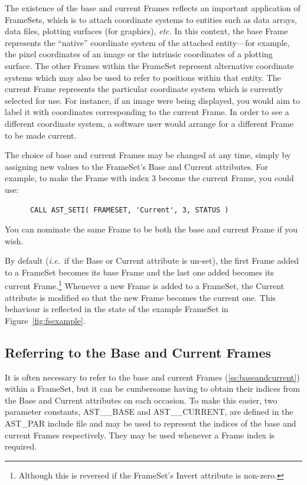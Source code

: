 \documentclass[twoside,11pt]{article}
\newcommand{\htmlref}[2]{#1}
\newcommand{\secref}[1]{\S\ref{#1}}
\renewcommand{\secref}[1]{\ref{#1}}
\begin{document}
The existence of the base and current Frames reflects an important
application of FrameSets, which is to attach coordinate systems to
entities such as data arrays, data files, plotting surfaces (for
graphics), {\em{etc.}}  In this context, the base Frame represents the
``native'' coordinate system of the attached entity---for example, the
pixel coordinates of an image or the intrinsic coordinates of a
plotting surface. The other Frames within the FrameSet represent
alternative coordinate systems which may also be used to refer to
positions within that entity.  The current Frame represents the
particular coordinate system which is currently selected for use. For
instance, if an image were being displayed, you would aim to label it
with coordinates corresponding to the current Frame. In order to see a
different coordinate system, a software user would arrange for a
different Frame to be made current.

The choice of base and current Frames may be changed at any time,
simply by assigning new values to the FrameSet's Base and Current
attributes. For example, to make the Frame with index 3 become the
current Frame, you could use:

\small
\begin{verbatim}
      CALL AST_SETI( FRAMESET, 'Current', 3, STATUS )
\end{verbatim}
\normalsize

You can nominate the same Frame to be both the base and current Frame
if you wish.
\label{ss:baseandcurrentdefault}

By default ({\em{i.e.}}\ if the Base or Current attribute is un-set),
the first Frame added to a FrameSet becomes its base Frame and the
last one added becomes its current Frame.\footnote{Although this is
reversed if the FrameSet's \htmlref{Invert}{Invert} attribute is non-zero.} Whenever a
new Frame is added to a FrameSet, the Current attribute is modified so
that the new Frame becomes the current one. This behaviour is
reflected in the state of the example FrameSet in
Figure~\ref{fig:fsexample}.

\subsection{\label{ss:astbaseandastcurrent}Referring to the Base and Current Frames}

It is often necessary to refer to the base and current Frames
(\secref{ss:baseandcurrent}) within a \htmlref{FrameSet}{FrameSet}, but it can be
cumbersome having to obtain their indices from the \htmlref{Base}{Base} and \htmlref{Current}{Current}
attributes on each occasion. To make this easier, two parameter
constants, AST\_\_BASE and AST\_\_CURRENT, are defined in the AST\_PAR
include file and may be used to represent the indices of the base and
current Frames respectively. They may be used whenever a \htmlref{Frame}{Frame} index
is required.
\end{document}
